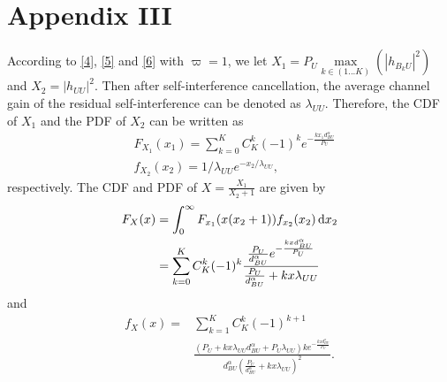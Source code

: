 \documentclass[10pt]{IEEEtran}
\newcommand{\rmd}{\,{\rm d}}
\begin{document}
\section*{Appendix III}
According to \eqref{4}, \eqref{5} and \eqref{6} with $\varpi = 1$, we let $X_1 = P_U\underset{k\in (1...K)}{\max}(|h_{B_kU}|^2)$ and $X_2 = |h_{UU}|^2$. Then after self-interference cancellation, the average channel gain of the residual self-interference can be denoted as $\lambda_{UU}$. Therefore, the CDF of $X_1$  and the PDF of $X_2$ can be written as
\begin{equation} \label{12}
\begin{split}
&F_{X_1}(x_1) = \sum^K_{k=0}C^k_K(-1)^ke^{-\frac{kx_1d_{BU}^{\alpha}}{P_U}}\\
&f_{X_2}(x_2) = 1/\lambda_{UU}e^{-x_2/\lambda_{UU}},
\end{split}
\end{equation}
respectively. The CDF and PDF of $X = \frac{X_1}{X_2+1}$ are given by
\begin{equation} \label{13}
\begin{split}
F_{X}(x) &=\int_0^\infty F_{x_1}(x(x_2+1))f_{x_2}(x_2)\rmd x_2\\
& =\sum^K_{k=0}C^k_K(-1)^k\frac{\frac{P_U}{d^\alpha_{BU}}e^{-\frac{kxd^\alpha_{BU}}{P_U}}}{\frac{P_U}{d^\alpha_{BU}}+kx\lambda_{UU}}
\end{split}
\end{equation}
and %
\begin{equation} \label{14}
\begin{split}
f_{X}(x) =&\sum^K_{k=1}C^k_K(-1)^{k+1}\\
&\frac{(P_U+kx\lambda_{UU}d^\alpha_{BU}+P_U\lambda_{UU})ke^{-\frac{kxd^\alpha_{BU}}{P_U}}}{d^\alpha_{BU}(\frac{P_U}{d^\alpha_{BU}}+kx\lambda_{UU})^2}.
\end{split}
\end{equation}
\end{document}
